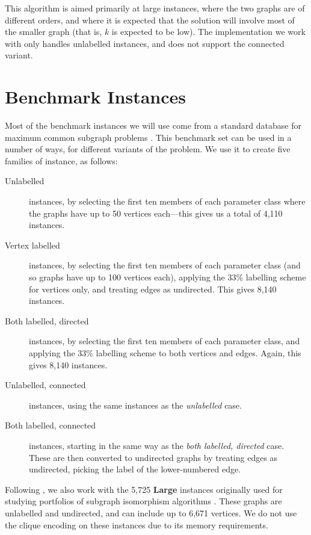\documentclass[sigconf]{acmart}
\begin{document}
This algorithm is aimed primarily at large instances, where the two graphs are of different orders,
and where it is expected that the solution will involve most of the smaller graph (that is, $k$ is
expected to be low). The implementation we work with only handles unlabelled instances, and does
not support the connected variant.

\section{Benchmark Instances}

Most of the benchmark instances we will use come from a standard database for maximum common
subgraph problems \citep{DBLP:journals/prl/SantoFSV03,DBLP:journals/jgaa/ConteFV07}. This benchmark
set can be used in a number of ways, for different variants of the problem. We use it to create five
families of instance, as follows:

\begin{description}
    \item[Unlabelled] instances, by selecting the first ten members of each parameter class where the
        graphs have up to 50 vertices each---this gives us a total of 4,110 instances.

    \item[Vertex labelled] instances, by selecting the first ten members of each parameter class
        (and so graphs have up to 100 vertices each), applying the 33\% labelling scheme for
        vertices only, and treating edges as undirected. This gives 8,140 instances.

    \item[Both labelled, directed] instances, by selecting the first ten members of each parameter
        class, and applying the 33\% labelling scheme to both vertices and edges. Again, this gives
        8,140 instances.

    \item[Unlabelled, connected] instances, using the same instances as the \emph{unlabelled} case.

    \item[Both labelled, connected] instances, starting in the same way as the \emph{both labelled,
        directed} case. These are then converted to undirected graphs by treating edges as
        undirected, picking the label of the lower-numbered edge.
\end{description}

\noindent
Following \citet{DBLP:conf/aaai/HoffmannMR17}, we also work with the 5,725 \textbf{Large} instances
originally used for studying portfolios of subgraph isomorphism algorithms
\citep{DBLP:conf/lion/KotthoffMS16}. These graphs are unlabelled and undirected, and can include up
to 6,671 vertices. We do not use the clique encoding on these instances due to its
memory requirements.
\end{document}
